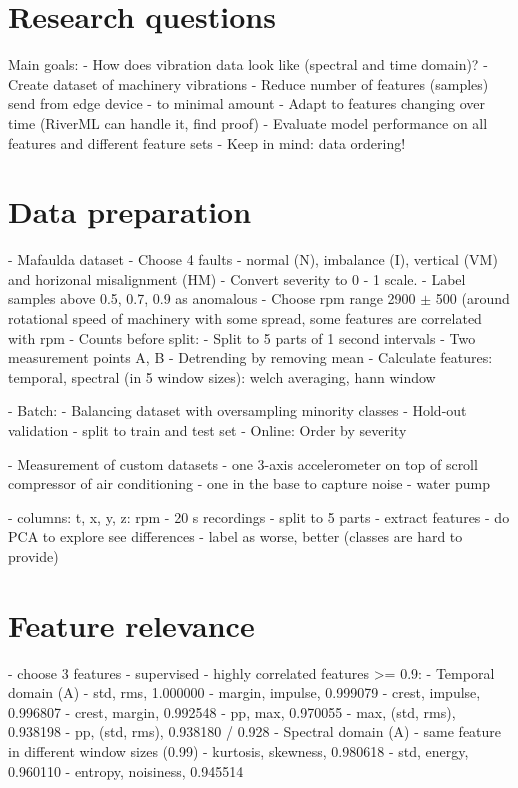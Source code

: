 \section{Research questions}
Main goals:
	- How does vibration data look like (spectral and time domain)?
	- Create dataset of machinery vibrations
	- Reduce number of features (samples) send from edge device - to minimal amount
	- Adapt to features changing over time (RiverML can handle it, find proof)
	- Evaluate model performance on all features and different feature sets
	- Keep in mind: data ordering!

\section{Data preparation}
- Mafaulda dataset
	- Choose 4 faults - normal (N), imbalance (I), vertical (VM) and horizonal misalignment (HM)
	- Convert severity to 0 - 1 scale.
		- Label samples above 0.5, 0.7, 0.9 as anomalous
	- Choose rpm range 2900 $\pm$ 500 (around rotational speed of machinery with some spread, some features are correlated with rpm 
	- Counts before split: 
		- Split to 5 parts of 1 second intervals
	- Two measurement points A, B
	- Detrending by removing mean
	- Calculate features: temporal, spectral (in 5 window sizes): welch averaging, hann window
	
	- Batch: 
		- Balancing dataset with oversampling minority classes	
		- Hold-out validation - split to train and test set
	- Online: Order by severity

- Measurement of custom datasets 
	- one 3-axis accelerometer on top of scroll compressor of air conditioning
		- one in the base to capture noise
	- water pump
	
	- columns: t, x, y, z: rpm
	- 20 s recordings - split to 5 parts - extract features
	- do PCA to explore see differences
	- label as worse, better (classes are hard to provide)


\section{Feature relevance}
- choose 3 features
- supervised
	- highly correlated features >= 0.9:
		- Temporal domain (A)
			- std, rms, 1.000000
			- margin, impulse, 0.999079
			- crest, impulse, 0.996807
			- crest, margin,	0.992548
			- pp, max, 0.970055
			- max, (std, rms), 0.938198
			- pp, (std, rms), 0.938180 / 0.928
		- Spectral domain (A)
			- same feature in different window sizes (0.99)
			- kurtosis, skewness, 0.980618
			- std, energy, 0.960110
			- entropy, noisiness, 0.945514


